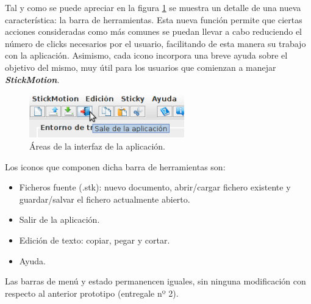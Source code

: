 \documentclass[a4paper,12pt]{article}
\begin{document}
  Tal y como se puede apreciar en la figura \ref{detalleBarraHerramientas} se muestra un detalle de una nueva característica: la barra de
  herramientas. Esta nueva función permite que ciertas acciones consideradas como más comunes se puedan llevar a cabo reduciendo el número de clicks
  necesarios por el usuario, facilitando de esta manera su trabajo con la aplicación. Asimismo, cada icono incorpora una breve ayuda sobre el
  objetivo del mismo, muy útil para los usuarios que comienzan a manejar \textit{\textbf{StickMotion}}.
  \begin{figure} [h] \begin{center}
    \includegraphics[width=0.6\textwidth]{DetalleTooltip}
    \caption{Áreas de la interfaz de la aplicación.} \label{detalleBarraHerramientas}
  \end{center} \end{figure}
  
  Los iconos que componen dicha barra de herramientas son:
  \begin{itemize}
    \item Ficheros fuente (.stk): nuevo documento, abrir/cargar fichero existente y guardar/salvar el fichero actualmente abierto.
    \item Salir de la aplicación.
    \item Edición de texto: copiar, pegar y cortar.
    \item Ayuda.\\[1cm]
  \end{itemize}

  Las barras de menú y estado permanencen iguales, sin ninguna modificación con respecto al anterior prototipo (entregale nº 2).\\
\end{document}
